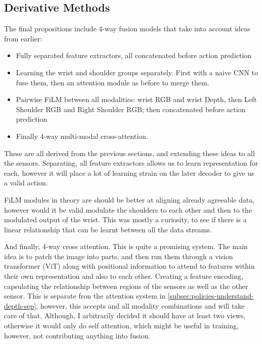 \subsection{Derivative Methods}\label{subsec:derivative-methods}
The final propositions include 4-way fusion models that take into account ideas from earlier:
\begin{itemize}
  \item Fully separated feature extractors, all concatenated before action prediction 
  \item Learning the wrist and shoulder groups separately. First with a naive CNN to fuse them, then an attention module as before to merge them.
  \item Pairwise FiLM between all modalities: wrist RGB and wrist Depth, then Left Shoulder RGB and Right Shoulder RGB; then concatenated before action prediction
  \item Finally 4-way multi-modal cross-attention. 
\end{itemize}

These are all derived from the previous sections, and extending these ideas to all the sensors. Separating, all feature extractors allows us to learn representation for each, however it will place a lot of learning strain on the later decoder to give us a valid action. 

FiLM modules in theory are should be better at aligning already agreeable data, however would it be valid modulate the shoulders to each other and then to the modulated output of the wrist. This was mostly a curiosity, to see if there is a linear relationship that can be learnt between all the data streams.

And finally, 4-way cross attention. This is quite a promising system. The main idea is to patch the image into parts, and then run them through a vision transformer (ViT) along with positional information to attend to features within their own representation and also to each other. Creating a feature encoding, capsulating the relationship between regions of the sensors as well as the other sensor.  This is separate fron the attention system in \ref{subsec:policies-understand-depth-sep}, however, this accepts and all modality combinations and will take care of that. Although, I arbitrarily decided it should have at least two views, otherwise it would only do self attention, which might be useful in training, however, not contributing anything into fusion.


